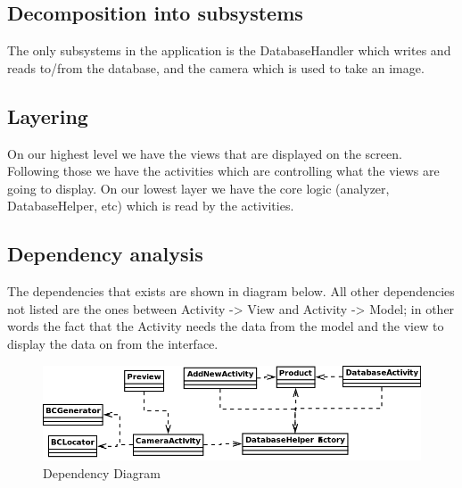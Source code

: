 \documentclass{report}
\begin{document}
\subsection{Decomposition into subsystems}
The only subsystems in the application is the DatabaseHandler which writes and reads to/from the database, and the camera which is used to take an image. 

\subsection{Layering}
On our highest level we have the views that are displayed on the screen. Following those we have the activities which are controlling what the views are going to display. On our lowest layer we have the core logic (analyzer, DatabaseHelper, etc) which is read by the activities.

\subsection{Dependency analysis}
The dependencies that exists are shown in diagram below. All other dependencies not listed are the ones between Activity -> View and Activity -> Model; in other words the fact that the Activity needs the data from the model and the view to display the data on from the interface.

\begin{figure}[H]
		\centering
		\includegraphics[width=\textwidth]{dependencydiagram.png}
		\caption{Dependency Diagram}
		\label{fig:Dependency Diagram}
\end{figure}
\end{document}
